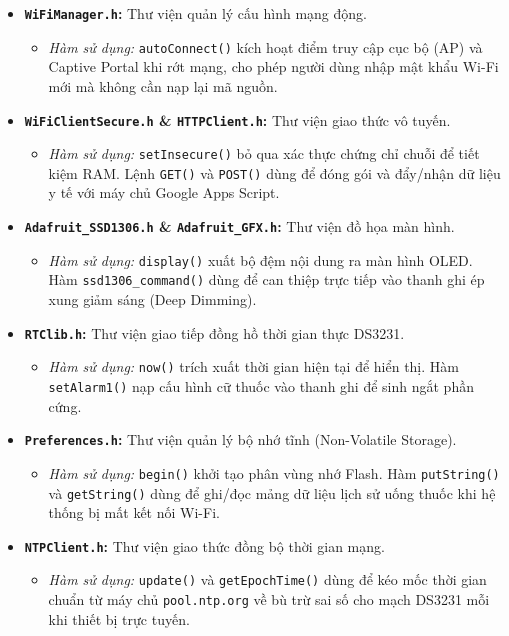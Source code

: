 \documentclass[12pt, a4paper, oneside]{article}
\begin{document}
\begin{itemize}
    \item \textbf{\texttt{WiFiManager.h}:} Thư viện quản lý cấu hình mạng động.
    \begin{itemize}
        \item \textit{Hàm sử dụng:} \texttt{autoConnect()} kích hoạt điểm truy cập cục bộ (AP) và Captive Portal khi rớt mạng, cho phép người dùng nhập mật khẩu Wi-Fi mới mà không cần nạp lại mã nguồn.
    \end{itemize}
    
    \item \textbf{\texttt{WiFiClientSecure.h} \& \texttt{HTTPClient.h}:} Thư viện giao thức vô tuyến.
    \begin{itemize}
        \item \textit{Hàm sử dụng:} \texttt{setInsecure()} bỏ qua xác thực chứng chỉ chuỗi để tiết kiệm RAM. Lệnh \texttt{GET()} và \texttt{POST()} dùng để đóng gói và đẩy/nhận dữ liệu y tế với máy chủ Google Apps Script.
    \end{itemize}
    
    \item \textbf{\texttt{Adafruit\_SSD1306.h} \& \texttt{Adafruit\_GFX.h}:} Thư viện đồ họa màn hình.
    \begin{itemize}
        \item \textit{Hàm sử dụng:} \texttt{display()} xuất bộ đệm nội dung ra màn hình OLED. Hàm \texttt{ssd1306\_command()} dùng để can thiệp trực tiếp vào thanh ghi ép xung giảm sáng (Deep Dimming).
    \end{itemize}
    
    \item \textbf{\texttt{RTClib.h}:} Thư viện giao tiếp đồng hồ thời gian thực DS3231.
    \begin{itemize}
        \item \textit{Hàm sử dụng:} \texttt{now()} trích xuất thời gian hiện tại để hiển thị. Hàm \texttt{setAlarm1()} nạp cấu hình cữ thuốc vào thanh ghi để sinh ngắt phần cứng.
    \end{itemize}
    
    \item \textbf{\texttt{Preferences.h}:} Thư viện quản lý bộ nhớ tĩnh (Non-Volatile Storage).
    \begin{itemize}
        \item \textit{Hàm sử dụng:} \texttt{begin()} khởi tạo phân vùng nhớ Flash. Hàm \texttt{putString()} và \texttt{getString()} dùng để ghi/đọc mảng dữ liệu lịch sử uống thuốc khi hệ thống bị mất kết nối Wi-Fi.
    \end{itemize}
    
    \item \textbf{\texttt{NTPClient.h}:} Thư viện giao thức đồng bộ thời gian mạng.
    \begin{itemize}
        \item \textit{Hàm sử dụng:} \texttt{update()} và \texttt{getEpochTime()} dùng để kéo mốc thời gian chuẩn từ máy chủ \texttt{pool.ntp.org} về bù trừ sai số cho mạch DS3231 mỗi khi thiết bị trực tuyến.
    \end{itemize}
\end{itemize}
\end{document}
